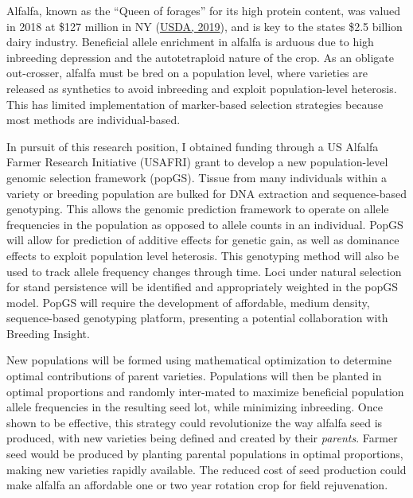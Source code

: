 \documentclass[11pt]{article}
\newcommand{\nicholas}[1]{{\color{nicholasCol} [\textbf{NS:} #1 (\today\ \currenttime)]}}
\begin{document}
Alfalfa, known as the ``Queen of forages'' for its high protein content, was valued in 2018 at \$127 million in NY (\href{https://www.nass.usda.gov/Quick_Stats/Ag_Overview/stateOverview.php?state=NEW%20YORK}{USDA, 2019}), and is key to the states \$2.5 billion dairy industry. Beneficial allele enrichment in alfalfa is arduous due to high inbreeding depression and the autotetraploid nature of the crop. As an obligate out-crosser, alfalfa must be bred on a population level, where varieties are released as synthetics to avoid inbreeding and exploit population-level heterosis. This has limited implementation of marker-based selection strategies because most methods are individual-based. %



In pursuit of this research position, I obtained funding through a US Alfalfa Farmer Research Initiative (USAFRI) grant to develop a new population-level genomic selection framework (popGS). Tissue from many individuals within a variety or breeding population are bulked for DNA extraction and sequence-based genotyping. This allows the genomic prediction framework to operate on allele frequencies in the population as opposed to allele counts in an individual. PopGS will allow for prediction of additive effects for genetic gain, as well as dominance effects to exploit population level heterosis. This genotyping method will also be used to track allele frequency changes through time. Loci under natural selection for stand persistence will be identified and appropriately weighted in the popGS model. PopGS will require the development of affordable, medium density, sequence-based genotyping platform, presenting a potential collaboration with Breeding Insight. 

New populations will be formed using mathematical optimization to determine optimal contributions of parent varieties. Populations will then be planted in optimal proportions and randomly inter-mated to maximize beneficial population allele frequencies in the resulting seed lot, while minimizing inbreeding. Once shown to be effective, this strategy could revolutionize the way alfalfa seed is produced, with new varieties being defined and created by their \emph{parents}. Farmer seed would be produced by planting parental populations in optimal proportions, making new varieties rapidly available. The reduced cost of seed production could make alfalfa an affordable one or two year rotation crop for field rejuvenation.
\end{document}
